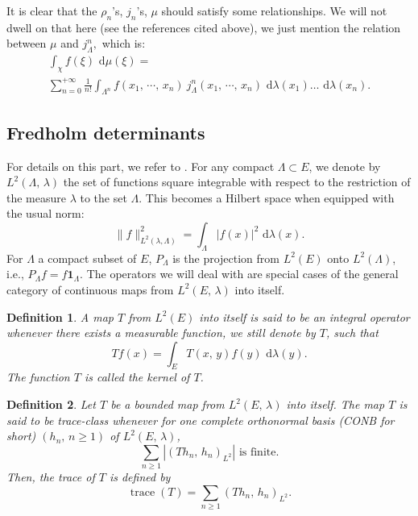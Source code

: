 \documentclass[11pt,a4paper]{amsart}
\newtheorem{Definition}{Definition}
\begin{document}
It is clear that the $\rho_n$'s, $j_n$'s, $\mu$ should satisfy some
relationships. We will not dwell on that here (see the references
cited above), we just mention the relation between $\mu$ and
$j^n_{\Lambda},$ which is:
\begin{multline}\label{janossy}
  \int_{\chi}{f\left( \xi \right) {\text{ d}}\mu(\xi) }=\\
  \sum_{n=0}^{+\infty}\frac{1}{n!}\int_{\Lambda^n}{f(x_1,\, \cdots,\,
    x_n)\ j^n_{\Lambda}\left( x_{1},\, \cdots,\, x_{n}\right)
    {\text{ d}}\lambda(x_1)\ldots{\text{ d}}\lambda(x_n) }.
\end{multline}

\subsection{Fredholm determinants}
For details on this part, we refer to \cite{0635.47002,MR2154153}. For
any compact $\Lambda \subset E$, we denote by $L^2(\Lambda,\,
\lambda)$ the set of functions square integrable with respect to the
restriction of the measure $\lambda$ to the set $\Lambda$. This
becomes a Hilbert space when equipped with the usual norm:
\begin{equation*}
  \|f\|^2_{L^2(\lambda,\Lambda)}=\int_{\Lambda}|f(x)|^2 {\text{ d}}\lambda(x).
\end{equation*}
For $\Lambda$ a compact subset of $E$, $P_{\Lambda}$ is the projection
from $L^2(E)$ onto $L^2(\Lambda)$, i.e., $P_\Lambda f=f{{\mathbf 1}}_\Lambda.$
The operators we will deal with are special cases of the general
category of continuous maps from $L^2(E,\, \lambda)$ into itself.
\begin{Definition}
  A map $T$ from $L^2(E)$ into itself is said to be an integral
  operator whenever there exists a measurable function, we still
  denote by $T$, such that
  \begin{equation*}
    Tf(x)=\int_E T(x,\, y) f(y){\text{ d}} \lambda(y).
  \end{equation*}
  The function $T$ is called the kernel of $T$.
\end{Definition}
\begin{Definition}
  Let $T$ be a bounded map from $L^2(E,\, \lambda)$ into itself. The
  map $T$ is said to be trace-class whenever for one complete
  orthonormal basis (CONB for short) $(h_n,\, n\ge 1)$ of $L^2(E,\,
  \lambda)$,
  \begin{equation*}
    \sum_{n\ge 1} |(Th_n,\, h_n)_{L^2}|\text{ is finite.}
  \end{equation*}
  Then, the trace of $T$ is defined by
  \begin{equation*}
    {\operatorname{trace}}(T)= \sum_{n\ge 1} (Th_n,\, h_n)_{L^2}.
  \end{equation*}
\end{Definition}
\end{document}

